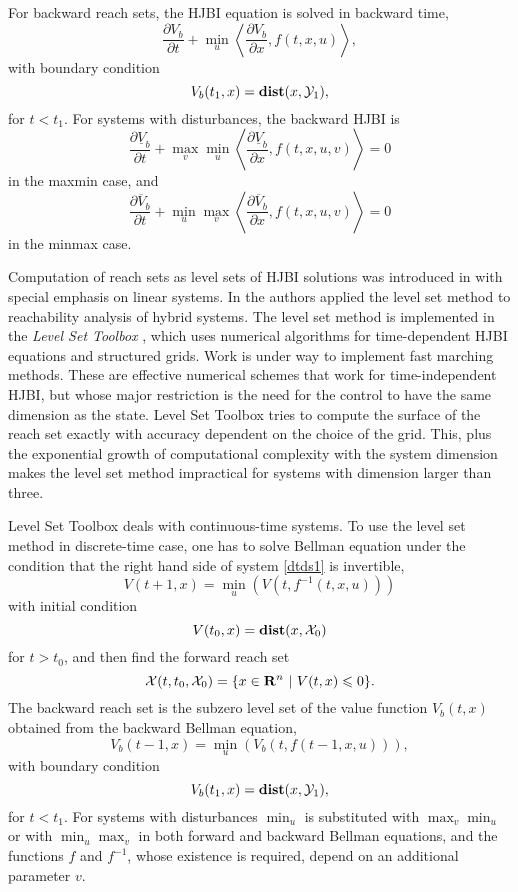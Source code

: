For backward reach sets, the HJBI equation is solved in backward time,
\[ \frac{\partial V_b}{\partial t} +
\min_u\left\langle\frac{\partial V_b}{\partial x}, f(t, x, u)\right\rangle ,\]
with boundary condition
\[ V_b(t_1, x) = {\bf dist}(x, \YY_1) ,\]
for $t<t_1$.
For systems with disturbances, the backward HJBI is
\[ \frac{\partial \underline{V}_b}{\partial t} +
\max_v\min_u\left\langle\frac{\partial \underline{V}_b}{\partial x},
f(t, x, u, v)\right\rangle = 0 \]
in the maxmin case, and
\[ \frac{\partial \overline{V}_b}{\partial t} +
\min_u\max_v\left\langle\frac{\partial \overline{V}_b}{\partial x},
f(t, x, u, v)\right\rangle = 0 \]
in the minmax case.

Computation of reach sets as level sets of HJBI solutions was introduced
in \cite{kurvalyi, kurzhanski98, kurvar01} with special emphasis on linear
systems.
In \cite{mitchell} the authors applied the level set method to reachability
analysis of hybrid systems.
The level set method is implemented in the \emph{Level Set Toolbox}
\cite{levelset}, which
uses  numerical algorithms for time-dependent HJBI
equations and structured grids.
Work is under way to implement fast marching methods.  These are effective
numerical schemes that work for time-independent HJBI, but whose major
restriction is the need for the control to have the same dimension as the state.
Level Set Toolbox tries to compute the surface of the reach set exactly
with accuracy dependent on the choice of the grid.
This, plus the exponential growth of computational complexity with the
system dimension makes the level set method impractical for systems
with dimension larger than three.

Level Set Toolbox deals with continuous-time systems.
To use the level set method in discrete-time case, one has to solve
Bellman equation under the condition that the right hand side of system
\ref{dtds1} is invertible,
\[ V(t+1, x) = \min_u(V(t, f^{-1}(t, x, u))) \]
with initial condition
\[ V(t_0, x) = {\bf dist}(x, \XX_0) \]
for $t>t_0$, and then find the forward reach set
\[ \XX(t, t_0, \XX_0) = \{x\in{\bf R}^n ~|~ V(t, x)\leq0\}. \]
The backward reach set is the subzero level set of the value function $V_b(t, x)$
obtained from the backward Bellman equation,
\[ V_b(t-1, x) = \min_u(V_b(t, f(t-1, x, u))), \]
with boundary condition
\[ V_b(t_1, x) = {\bf dist}(x, \YY_1), \]
for $t<t_1$.
For systems with disturbances $\min_u$ is substituted with $\max_v\min_u$
or with $\min_u\max_v$ in both forward and backward Bellman equations,
and the functions $f$ and $f^{-1}$, whose existence is required, depend on
an additional parameter $v$.

